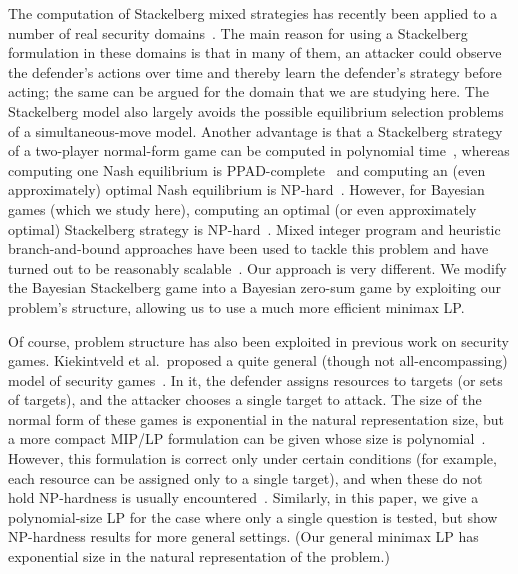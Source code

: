 \documentclass{article}
\begin{document}
The computation of Stackelberg mixed strategies has recently been
applied to a number of real security
domains~\cite{Pita08:Using,Tsai09:IRIS,Shieh12:PROTECT,Yin12:TRUSTS}.
The main reason
for using a Stackelberg formulation in these domains is that in many
of them, an attacker could observe the defender's actions over time
and thereby learn the defender's strategy before acting; the same can
be argued for the domain that we are studying here.  The Stackelberg
model also largely avoids the possible equilibrium selection problems
of a simultaneous-move model.  Another advantage is that a Stackelberg
strategy of a two-player normal-form game can be computed in
polynomial time~\cite{Conitzer06:Computing,Stengel10:Leadership},
whereas computing one Nash equilibrium is
PPAD-complete~\cite{Daskalakis09:Complexity,Chen09:Settling} and
computing an (even approximately) optimal
Nash equilibrium is NP-hard~\cite{Gilboa89:Nash,Conitzer03:Nash}.
However, for Bayesian games
(which we study here), computing an optimal (or even approximately
optimal) Stackelberg strategy is
NP-hard~\cite{Conitzer06:Computing,Letchford09:Learning}.  Mixed integer program
and heuristic branch-and-bound approaches have been used to tackle
this problem and have turned out to be reasonably
scalable~\cite{Paruchuri08:Bayesian,Jain11:Quality}. Our approach is
very
different. We modify the Bayesian Stackelberg game into a Bayesian
zero-sum game by exploiting our problem's structure, allowing us to
use a much more efficient minimax LP.

Of course, problem structure has also been exploited in previous work
on security games.
Kiekintveld et al.~proposed a quite general (though not
all-encompassing) model of security games~\cite{Kiekintveld09:Computing}.
In it, the defender assigns resources to targets (or sets of targets),
and the attacker chooses a single target to attack.  The size of the
normal form of these games is exponential in the natural
representation size, but a more compact MIP/LP formulation can be
given whose size is polynomial~\cite{Kiekintveld09:Computing}.
However, this formulation is
correct only under certain conditions (for example, each resource can
be assigned only to a single target), and when these do not hold
NP-hardness is usually
encountered~\cite{Korzhyk10:Complexity,Letchford13:Solving}.
Similarly, in this paper,
we give a polynomial-size LP for the case where only a single question
is tested, but show NP-hardness results for more general settings.  (Our
general minimax LP has exponential size in the natural representation
of the problem.)
\end{document}
